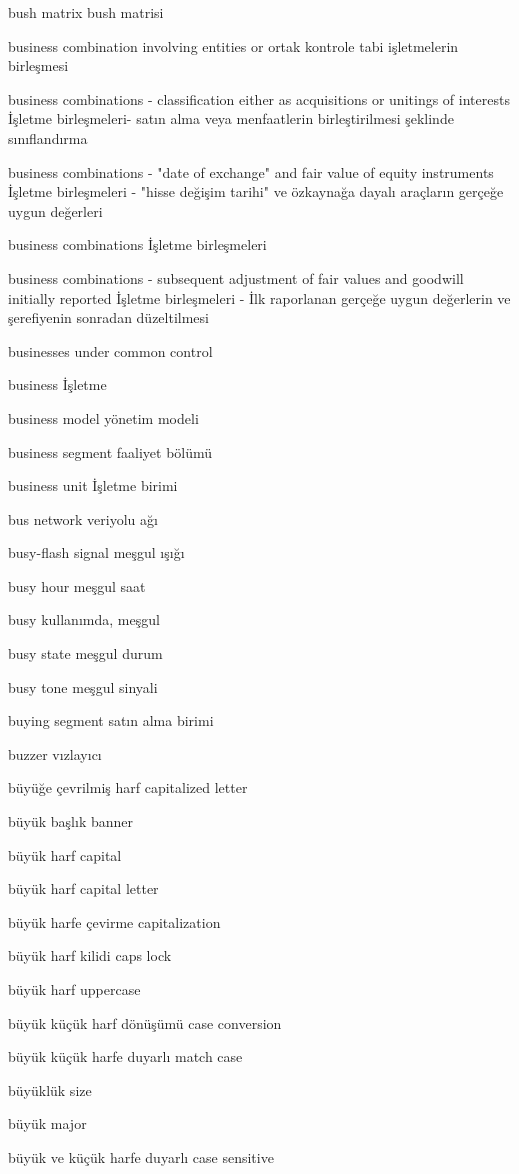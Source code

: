 \documentclass[12pt,fleqn]{article}\usepackage{../../common}
\begin{document}
bush matrix bush matrisi

business combination involving entities or ortak kontrole tabi işletmelerin birleşmesi

business combinations - classification either as acquisitions or unitings of interests İşletme birleşmeleri- satın alma veya menfaatlerin birleştirilmesi şeklinde sınıflandırma

business combinations - "date of exchange" and fair value of equity instruments İşletme birleşmeleri - "hisse değişim tarihi" ve özkaynağa dayalı araçların gerçeğe uygun değerleri

business combinations İşletme birleşmeleri

business combinations - subsequent adjustment of fair values and goodwill initially reported İşletme birleşmeleri - İlk raporlanan gerçeğe uygun değerlerin ve şerefiyenin sonradan düzeltilmesi

businesses under common control

business İşletme

business model yönetim modeli

business segment faaliyet bölümü

business unit İşletme birimi

bus network veriyolu ağı

busy-flash signal meşgul ışığı

busy hour meşgul saat

busy kullanımda, meşgul

busy state meşgul durum

busy tone meşgul sinyali

buying segment satın alma birimi

buzzer vızlayıcı

büyüğe çevrilmiş harf capitalized letter

büyük başlık banner

büyük harf capital

büyük harf capital letter

büyük harfe çevirme capitalization

büyük harf kilidi caps lock

büyük harf uppercase

büyük küçük harf dönüşümü case conversion

büyük küçük harfe duyarlı match case

büyüklük size

büyük major

büyük ve küçük harfe duyarlı case sensitive
\end{document}
